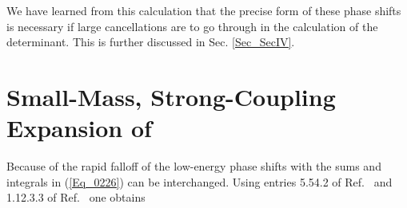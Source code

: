 \documentclass[a4paper,twocolumn,showpacs,preprintnumbers,amsmath,amssymb]{revtex4}
\begin{document}
We have learned from this calculation that the precise form of these
phase shifts is necessary if large cancellations are to go through in
the calculation of the determinant. This is further discussed in
Sec. \ref{Sec_SecIV}.

\section{\label{Sec_SecIV}
Small-Mass, Strong-Coupling Expansion of \coordHE{}}

Because of the rapid falloff of the low-energy phase shifts
with \coordHE{} the sums and integrals in (\ref{Eq_0226}) can be
interchanged. Using entries 5.54.2 of Ref.~\cite{Gradshteyn65} and
1.12.3.3 of Ref.~\cite{Prudnikov88} one obtains
\end{document}
